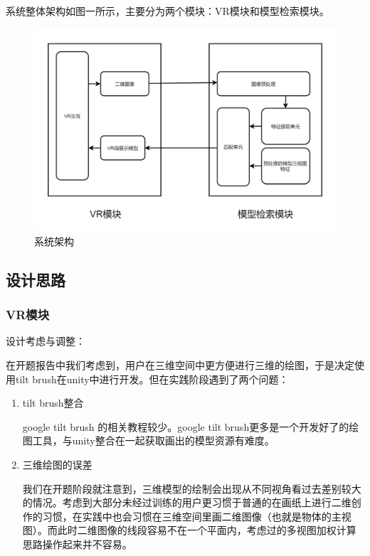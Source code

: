 \documentclass{article}
\begin{document}
系统整体架构如图一所示，主要分为两个模块：VR模块和模型检索模块。

\begin{figure}[htb]
\centering
\includegraphics[width=1\textwidth]{images/architecture.png}
\caption{系统架构}\label{fig:digit}
\end{figure} 

\subsection{设计思路}

\subsubsection{VR模块}
设计考虑与调整：

在开题报告中我们考虑到，用户在三维空间中更方便进行三维的绘图，于是决定使用tilt brush在unity中进行开发。但在实践阶段遇到了两个问题：
\begin{enumerate}
    \item tilt brush整合
    
    \qquad google tilt brush 的相关教程较少。google tilt brush更多是一个开发好了的绘图工具，与unity整合在一起获取画出的模型资源有难度。
    
    \item 三维绘图的误差
    
    \qquad 我们在开题阶段就注意到，三维模型的绘制会出现从不同视角看过去差别较大的情况。考虑到大部分未经过训练的用户更习惯于普通的在画纸上进行二维创作的习惯，在实践中也会习惯在三维空间里画二维图像（也就是物体的主视图）。而此时二维图像的线段容易不在一个平面内，考虑过的多视图加权计算思路操作起来并不容易。
    
\end{enumerate}
\end{document}
